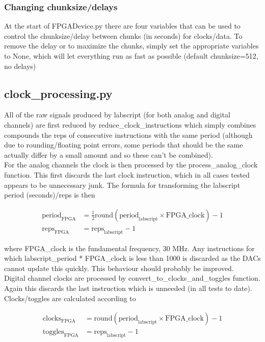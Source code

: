 \documentclass[11pt,a4paper]{article}
\begin{document}
\subsubsection{Changing chunksize/delays}
At the start of FPGADevice.py there are four variables that can be used to
control the chunksize/delay between chunks (in seconds) for clocks/data.
To remove the delay or to maximize the chunks, simply set the
appropriate variables to None, which will let everything run as fast as
possible (default chunksize=512, no delays)

\subsection{clock\_processing.py}
\label{clockproc}
All of the raw signals produced by labscript (for both analog and
digital channels) are first reduced by reduce\_clock\_instructions which
simply combines compounds the reps of consecutive instructions with the
same period (although due to rounding/floating point errors, some
periods that should be the same actually differ by a small amount and so
these can't be combined). \\

For the analog channels the clock is then processed by the
process\_analog\_clock function. This first discards the last clock
instruction, which in all cases tested appears to be unnecessary junk.
The formula for transforming the labscript period (seconds)/reps is then

\begin{align}
	\text{period}_{\text{FPGA}} &= \frac{1}{2} \text{round}(\text{period}_{\text{labscript}} \times \text{FPGA\_clock}) - 1 \\
	\text{reps}_{\text{FPGA}} &= \text{reps}_{\text{labscript}} - 1
\end{align}

where FPGA\_clock is the fundamental frequency, 30 MHz. Any
instructions for which labscript\_period * FPGA\_clock is less than
1000 is discarded as the DACs cannot update this quickly. This behaviour
should probably be improved. \\

Digital channel clocks are processed by
convert\_to\_clocks\_and\_toggles function. Again this discards the last
instruction which is unneeded (in all tests to date). Clocks/toggles are
calculated according to

\begin{align}
	\text{clocks}_{\text{FPGA}} &= \text{round}(\text{period}_{\text{labscript}} \times \text{FPGA\_clock}) - 1 \\
	\text{toggles}_{\text{FPGA}} &= \text{reps}_{\text{labscript}} - 1
\end{align}
\end{document}
